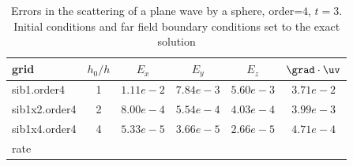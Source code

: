 
\begin{table}[hbt]
\begin{center}
\begin{tabular}{|l|c|c|c|c|c|} \hline\hline 
grid           & $h_0/h$ &    $E_x$       &  $E_y$       & $E_z$        & $\grad\cdot\uv$\\ \hline 
sib1.order4    &   1     &  $1.11e-2$  & $7.84e-3$ & $5.60e-3$ & $3.71e-2$   \\ \hline
sib1x2.order4  &   2     &  $8.00e-4$  & $5.54e-4$ & $4.03e-4$ & $3.99e-3$   \\ \hline
sib1x4.order4  &   4     &  $5.33e-5$  & $3.66e-5$ & $2.66e-5$ & $4.71e-4$   \\ \hline
   rate        &         &  $       $  & $       $ & $       $ & $       $   \\ \hline
\end{tabular}
\caption{Errors in the scattering of a plane wave by a sphere, order=$4$, $t=3$. Initial conditions and
   far field boundary conditions set to the exact solution}\label{table:scatSphere}
\end{center}
\end{table}

